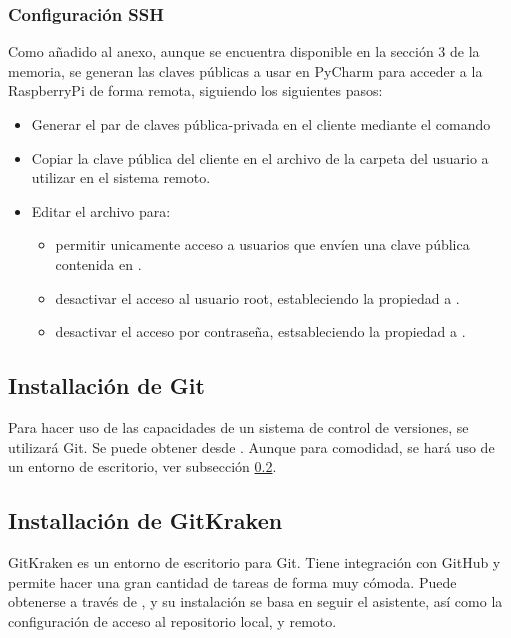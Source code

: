 \subsubsection{Configuración SSH}
\label{subsub:sshconfig}

Como añadido al anexo, aunque se encuentra disponible en la sección 3 de la memoria, se generan las claves públicas a usar en PyCharm para acceder a la RaspberryPi de forma remota, siguiendo los siguientes pasos:

\begin{itemize}
\item Generar el par de claves pública-privada en el cliente mediante el comando 
\item Copiar la clave pública del cliente en el archivo  de la carpeta  del usuario a utilizar en el sistema remoto.
\item Editar el archivo  para:
	\begin{itemize}
	\item permitir unicamente acceso a usuarios que envíen una clave pública contenida en .
	\item desactivar el acceso al usuario root, estableciendo la propiedad  a .
	\item desactivar el acceso por contraseña, estsableciendo la propiedad  a .
	\end{itemize}	 
\end{itemize} 


\subsection{Installación de Git}
Para hacer uso de las capacidades de un sistema de control de versiones, se utilizará Git. Se puede obtener desde \citep{wiki:getGit}. Aunque para comodidad, se hará uso de un entorno de escritorio, ver subsección \ref{subsec:gitkraken}.

\subsection{Installación de GitKraken}
\label{subsec:gitkraken}
GitKraken es un entorno de escritorio para Git. Tiene integración con GitHub y permite hacer una gran cantidad de tareas de forma muy cómoda. Puede obtenerse a través de \citep{wiki:GitKraken}, y su instalación se basa en seguir el asistente, así como la configuración de acceso al repositorio local, y remoto.



